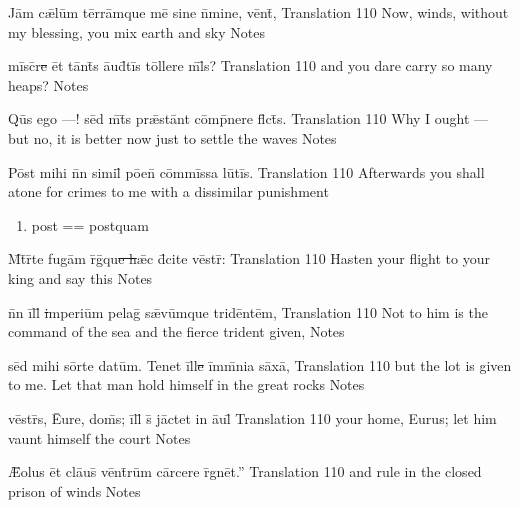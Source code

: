 \latline
  {J\=am c\={\ae}l\=um t\=err\=amqu\-e m\-e\={} s\-in\-e n\={}m\-in\-e, v\=ent\={\macron {\i}},}
  { Translation }
  {110}
  { Now, winds, without my blessing, you mix earth and sky }
  { Notes }


\latline
  {m\=isc\={}r\sout{e }\=et t\=ant\={}s \={au}d\={}t\=is t\=oll\-er\-e m\={}l\={}s?}
  { Translation }
  {110}
  { and you dare carry so many heaps? }
  { Notes }


\latline
  {Qu\={}s \-eg\-o ---! s\=ed m\={}t\={}s pr\={\ae}st\=ant c\=omp\={}n\-er\-e fl\={}ct\={}s.}
  { Translation }
  {110}
  { Why I ought --- but no, it is better now just to settle the waves }
  { Notes }





\latline
  {P\=ost m\-ih\-i n\={}n s\-im\-il\={\macron {\i}} p\={oe}n\={} c\=omm\=iss\-a l\-u\={}t\=is.}
  { Translation }
  {110}
  { Afterwards you shall atone for crimes to me with a dissimilar punishment }
  { \begin{enumerate}
  	\item post == postquam
  \end{enumerate} }


\latline
  {M\={}t\={}r\={}t\-e f\-ug\=am r\={}g\={\macron {\i}}qu\sout{e h}\={\ae}c d\={\macron {\i}}c\-it\-e v\=estr\={}:}
  { Translation }
  {110}
  { Hasten your flight to your king and say this }
  { Notes }


\latline
  {n\={}n \=ill\={\macron {\i}}\sout{ i}mp\-er\-i\=um p\-el\-ag\={\macron {\i}} s\={\ae}v\=umqu\-e tr\-id\=ent\=em,}
  { Translation }
  {110}
  { Not to him is the command of the sea and the fierce trident given,  }
  { Notes }





\latline
  {s\=ed m\-ih\-i s\=ort\-e d\-at\=um.  T\-en\-et \=ill\sout{e }\=imm\={}n\-i\-a s\=ax\=a,}
  { Translation }
  {110}
  { but the lot is given to me.  Let that man hold himself in the great rocks }
  { Notes }


\latline
  {v\=estr\={}s, \={Eu}r\-e, d\-om\={}s; \=ill\={} s\={} j\=act\-et \-in \={au}l\={}}
  { Translation }
  {110}
  { your home, Eurus; let him vaunt himself  the court }
  { Notes }


\latline
  {\={\AE}\-ol\-us \=et cl\={au}s\={} v\=ent\={}r\=um c\=arc\-er\-e r\={}gn\=et.''}
  { Translation }
  {110}
  { and rule in the closed prison of winds }
  { Notes }